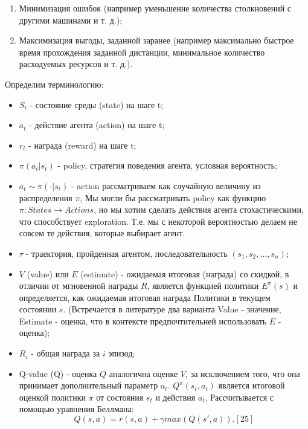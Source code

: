 \documentclass[bachelor, och, coursework]{shiza}
\begin{document}
\begin{enumerate}
    \item Минимизация ошибок (например уменьшение количества столкновений с другими машинами и т. д.);
    \item Максимизация выгоды, заданной заранее (например максимально быстрое время прохождения заданной дистанции, минимальное количество расходуемых ресурсов и т. д.).
\end{enumerate}

Определим терминологию:

\begin{itemize}
    \item $S_t$ - состояние среды (state) на шаге t;
    \item $a_t$ - действие агента (action) на шаге t;
    \item $r_t$ - награда (reward) на шаге t;
    \item $\pi(a_t|s_t)$ - policy, стратегия поведения агента, условная вероятность;
    \item $a_t\sim\pi(\cdot|s_t)$ - action рассматриваем как случайную величину из распределения $\pi$,
    Мы могли бы рассматривать policy как функцию $\pi:States\to Actions$, но мы хотим сделать действия агента стохастическими, что способствует exploration.
    Т.е. мы с некоторой вероятностью делаем не совсем те действия, которые выбирает агент.
    \item $\tau$ - траектория, пройденная агентом, последовательность $(s_1, s_2, ..., s_n) $;
    \item $V$ (value) или $E$ (estimate) - ожидаемая итоговая (награда) со скидкой, в отличии от мгновенной награды $R$, является функцией политики $E^\pi(s)$ и
    определяется, как ожидаемая итоговая награда Политики в текущем состоянии $s$. (Встречается в литературе два варианта Value - значение, Estimate - оценка,
    что в контексте предпочтительней использовать $E$ - оценка);
    \item $R_i$ - общая награда за $i$ эпизод;
    \item Q-value (Q) - оценка $Q$ аналогична оценке $V$, за исключением того, что она принимает дополнительный параметр $a_t$. $Q^\pi(s_t, a_t)$ является итоговой
    оценкой политики $\pi$ от состояния $s_t$ и действия $a_t$. Рассчитывается с помощью уравнения Беллмана:
    \begin{equation}
        Q(s, a) = r(s, a) + \gamma max(Q(s', a)). [25]
    \end{equation}
\end{itemize}
\end{document}
